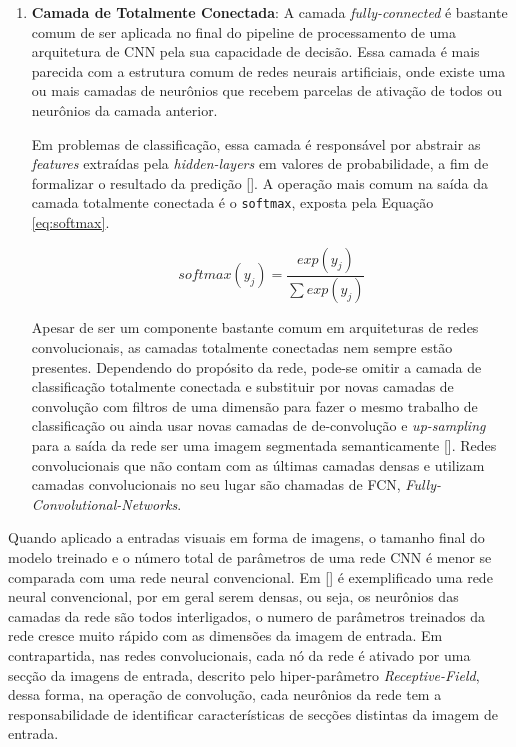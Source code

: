 \begin{enumerate}
    \item \textbf{Camada de Totalmente Conectada}:
            A camada \textit{fully-connected} é bastante comum de ser aplicada no final do pipeline de processamento de uma arquitetura de CNN pela sua capacidade de decisão. Essa camada é mais parecida com a estrutura comum de redes neurais artificiais, onde existe uma ou mais camadas de neurônios que recebem parcelas de ativação de todos ou neurônios da camada anterior.
            
            Em problemas de classificação, essa camada é responsável por abstrair as \textit{features} extraídas pela \textit{hidden-layers} em valores de probabilidade, a fim de formalizar o resultado da predição []. A operação mais comum na saída da camada totalmente conectada é o \texttt{softmax}, exposta pela Equação \ref{eq:softmax}.
            
            \begin{equation}
                \label{eq:softmax}
                softmax(y_j) = \frac{exp(y_j)}{\sum exp(y_j)}
            \end{equation}
            
            Apesar de ser um componente bastante comum em arquiteturas de redes convolucionais, as camadas totalmente conectadas nem sempre estão presentes. Dependendo do propósito da rede, pode-se omitir a camada de classificação totalmente conectada e substituir por novas camadas de convolução com filtros de uma dimensão para fazer o mesmo trabalho de classificação ou ainda usar novas camadas de de-convolução e \textit{up-sampling} para a saída da rede ser uma imagem segmentada semanticamente []. Redes convolucionais que não contam com as últimas camadas densas e utilizam camadas convolucionais no seu lugar são chamadas de FCN, \textit{Fully-Convolutional-Networks}.
\end{enumerate}

Quando aplicado a entradas visuais em forma de imagens, o tamanho final do modelo treinado e o número total de parâmetros de uma rede CNN é menor se comparada com uma rede neural convencional. Em [] é exemplificado uma rede neural convencional, por em geral serem densas, ou seja, os neurônios das camadas da rede são todos interligados, o numero de parâmetros treinados da rede cresce muito rápido com as dimensões da imagem de entrada. Em contrapartida, nas redes convolucionais, cada nó da rede é ativado por uma secção da imagens de entrada, descrito pelo hiper-parâmetro \textit{Receptive-Field}, dessa forma, na operação de convolução, cada neurônios da rede tem a responsabilidade de identificar características de secções distintas da imagem de entrada.

